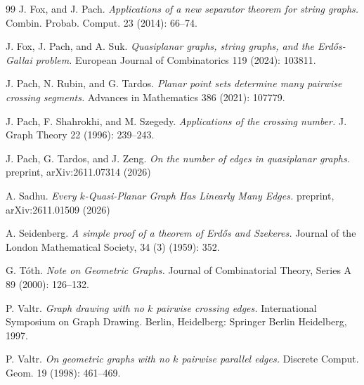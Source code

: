 \documentclass[11pt]{amsart}
\theoremstyle{definition}
\begin{document}
\begin{thebibliography}{99}
J. Fox, and J. Pach. 
\emph{Applications of a new separator theorem for string graphs.}
Combin. Probab. Comput. 23 (2014): 66--74.

J. Fox, J. Pach, and A. Suk.
\emph{Quasiplanar graphs, string graphs, and the Erd\H{o}s-Gallai problem.}
European Journal of Combinatorics 119 (2024): 103811.

J. Pach,  N. Rubin, and G. Tardos. 
\emph{Planar point sets determine many pairwise crossing segments.}
Advances in Mathematics 386 (2021): 107779.

J. Pach, F. Shahrokhi, and M. Szegedy.
\emph{Applications of the crossing number.}
J. Graph Theory 22 (1996): 239--243.

J. Pach, G. Tardos, and J. Zeng.
\emph{On the number of edges in quasiplanar graphs.}
preprint, arXiv:2611.07314 (2026)

A. Sadhu.
\emph{Every $k$-Quasi-Planar Graph Has Linearly Many Edges.}
preprint, arXiv:2611.01509 (2026)

 A. Seidenberg.
 \emph{A simple proof of a theorem of Erd\H{o}s and Szekeres.}
 Journal of the London Mathematical Society, 34 (3) (1959): 352.

G. T\'oth.
\emph{Note on Geometric Graphs.}
Journal of Combinatorial Theory, Series A 89 (2000): 126--132.

P. Valtr. 
\emph{Graph drawing with no $k$ pairwise crossing edges.}
International Symposium on Graph Drawing. Berlin, Heidelberg: Springer Berlin Heidelberg, 1997.

P. Valtr.
\emph{On geometric graphs with no $k$ pairwise parallel edges.}
Discrete Comput. Geom. 19 (1998): 461--469.

\end{thebibliography}
\end{document}
